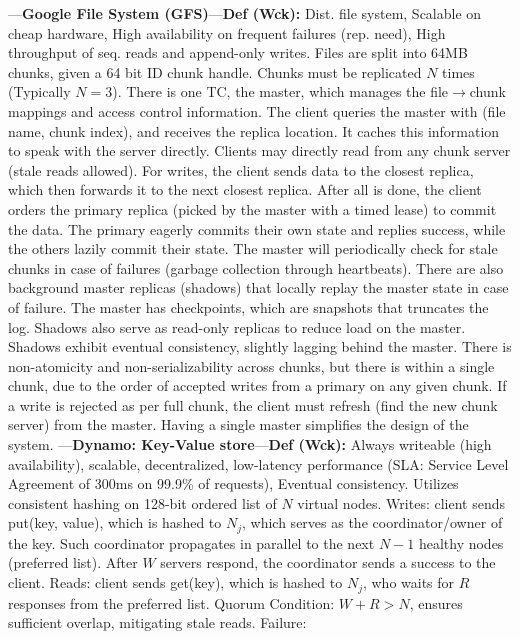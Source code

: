 \begin{multicols}{2}

\noindent
---\textbf{Google File System (GFS)}---\textbf{Def (Wck):} Dist. file system, Scalable on cheap hardware, High availability on frequent failures (rep. need), High throughput of seq. reads and append-only writes.
Files are split into 64MB chunks, given a 64 bit ID chunk handle. Chunks must be replicated $N$ times (Typically $N=3$). There is 
one TC, the master, which manages the file$\to$chunk mappings and access control information.
The client queries the master with (file name, chunk index), and receives the replica location.
It caches this information to speak with the server directly. Clients may directly read from any chunk server (stale reads allowed).
For writes, the client sends data to the closest replica, which then forwards it to the next closest replica.
After all is done, the client orders the primary replica (picked by the master with a timed lease) to commit the data. The primary
eagerly commits their own state and replies success, while the others lazily commit their state. The 
master will periodically check for stale chunks in case of failures (garbage collection through heartbeats). 
There are also background master replicas (shadows) that locally replay the master state in case of failure.
The master has checkpoints, which are snapshots that truncates the log. Shadows also serve as read-only replicas to reduce load on the master.
Shadows exhibit eventual consistency, slightly lagging behind the master.
There is non-atomicity and non-serializability across chunks, but there is within a single chunk, due to the order of
accepted writes from a primary on any given chunk. If a write is rejected as per full chunk, the client must refresh (find the new chunk server) from the master.
Having a single master simplifies the design of the system.
---\textbf{Dynamo: Key-Value store}---\textbf{Def (Wck):} Always writeable (high availability), scalable, decentralized, low-latency performance (SLA: Service Level Agreement of 300ms on 99.9\% of requests),
Eventual consistency. Utilizes consistent hashing on 128-bit ordered list of $N$ virtual nodes. Writes:
client sends put(key, value), which is hashed to $N_j$, which serves as the coordinator/owner of the key. Such coordinator propagates in parallel to the next $N-1$ healthy nodes (preferred list). After 
$W$ servers respond, the coordinator sends a success to the client. Reads: client sends get(key), which is hashed to $N_j$, who waits for $R$ responses from the preferred list. 
Quorum Condition: $W+R > N$, ensures sufficient overlap, mitigating stale reads. Failure:

\end{multicols}
